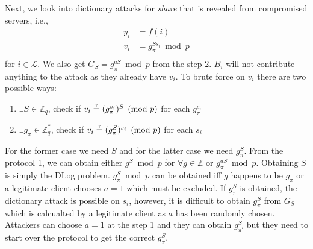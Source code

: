 Next, we look into dictionary attacks for {\em share} that is
revealed from compromised servers, i.e.,
\begin{align*}
  y_i &= f(i) \\
  v_i &= g_{\pi}^{Ss_i} \bmod p \\
\end{align*}
for $i \in \mathcal{L}$. We also get $G_S = g_{\pi}^{aS} \bmod p$ from
the step 2. $B_i$ will not contribute anything to the attack as they already
have $v_i$.
To brute force on $v_i$ there are two possible ways:
\begin{enumerate}
\item $\exists S \in \mathbb{Z}_q$, check if
  $v_i \stackrel{\text{\tiny ?}}{=} (g_{\pi}^{s_i})^S \pmod p$
  for each $g_{\pi}^{s_i}$ \\
\item $\exists g_{\pi} \in \mathbb{Z}^*_q$, check if
  $v_i \stackrel{\text{\tiny ?}}{=} (g_{\pi}^S)^{s_i} \pmod p$
  for each $s_i$
\end{enumerate}
For the former case we need $S$ and for the latter case we need
$g_{\pi}^S$. From the protocol 1, we can obtain either $g^S \bmod p$
for $\forall g \in \mathbb{Z}$ or $g_{\pi}^{aS} \bmod p$. Obtaining
$S$ is simply the {\sf DLog} problem. $g_{\pi}^S \bmod p$ can be
obtained iff $g$ happens to be $g_{\pi}$ or a legitimate client
chooses $a = 1$ which must be excluded.
If $g_{\pi}^S$ is obtained, the dictionary attack is possible on
$s_i$, however, it is difficult to obtain $g_{\pi}^S$ from $G_S$ which
is calcualted by a legitimate client as $a$ has been randomly
chosen. Attackers can choose $a = 1$ at the step 1 and they can obtain
$g_{\pi'}^S$ but they need to start over the protocol to get the
correct $g_{\pi}^S$.
